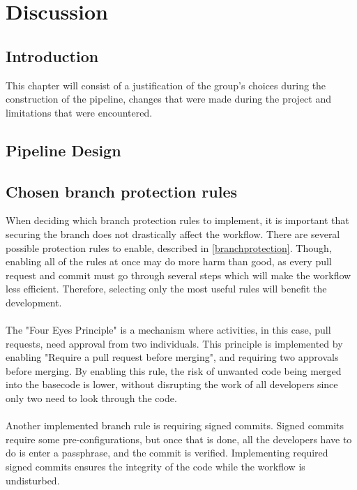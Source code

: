 \chapter{Discussion}
\section{Introduction}
This chapter will consist of a justification of the group's choices during the construction of the pipeline, changes that were made during the project and limitations that were encountered.  

\section{Pipeline Design}

\section{Chosen branch protection rules}
When deciding which branch protection rules to implement, it is important that securing the branch does not drastically affect the workflow. There are several possible protection rules to enable, described in \ref{branchprotection}. Though, enabling all of the rules at once may do more harm than good, as every pull request and commit must go through several steps which will make the workflow less efficient. Therefore, selecting only the most useful rules will benefit the development. 
\\~\\
The "Four Eyes Principle" is a mechanism where activities, in this case, pull requests, need approval from two individuals.  This principle is implemented by enabling "Require a pull request before merging", and requiring two approvals before merging. By enabling this rule, the risk of unwanted code being merged into the basecode is lower, without disrupting the work of all developers since only two need to look through the code. \cite{foureyes} 
\\~\\
Another implemented branch rule is requiring signed commits. Signed commits require some pre-configurations, but once that is done, all the developers have to do is enter a passphrase, and the commit is verified. Implementing required signed commits ensures the integrity of the code while the workflow is undisturbed.



